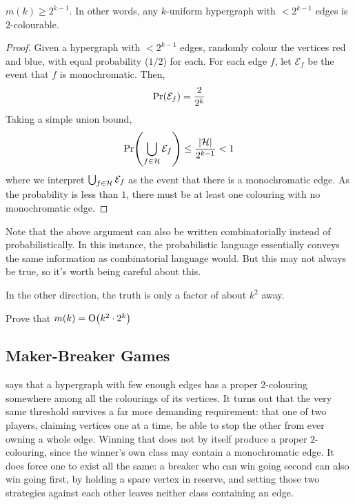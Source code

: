 \begin{boxtheorem}\label{Ch2:Thm:mk_Lower_Bound}
    $m(k) \geq 2^{k - 1}$. In other words, any $k$-uniform hypergraph with $< 2^{k - 1}$ edges is $2$-colourable.
\end{boxtheorem}
\begin{proof}
    Given a hypergraph with $< 2^{k-1}$ edges, randomly colour the vertices red and blue, with equal probability ($1/2$) for each. For each edge $f$, let $\mathcal{E}_f$ be the event that $f$ is monochromatic. Then,
    \begin{align*}
        \Pr\!\left( \mathcal{E}_f \right) = \frac{2}{2^k}
    \end{align*}
    Taking a simple union bound,
    \begin{align*}
        \Pr\!\left( \bigcup_{f \in \mathcal{H}} \mathcal{E}_f \right) \leq \frac{\left\lvert \mathcal{H} \right\rvert}{2^{k - 1}} < 1
    \end{align*}
    where we interpret $\bigcup_{f \in \mathcal{H}} \mathcal{E}_f$ as the event that there is a monochromatic edge. As the probability is less than $1$, there must be at least one colouring with no monochromatic edge.
\end{proof}

Note that the above argument can also be written combinatorially instead of probabilistically. In this instance, the probabilistic language essentially conveys the same information as combinatorial language would. But this may not always be true, so it's worth being careful about this.

In the other direction, the truth is only a factor of about $k^2$ away.

\begin{boxexercise}
    Prove that $m(k) = \operatorname{O}\!\left( k^2 \cdot 2^k \right)$
\end{boxexercise}

\subsection{Maker-Breaker Games}

 says that a hypergraph with few enough edges has a proper $2$-colouring somewhere among all the colourings of its vertices. It turns out that the very same threshold survives a far more demanding requirement: that one of two players, claiming vertices one at a time, be able to stop the other from ever owning a whole edge. Winning that does not by itself produce a proper $2$-colouring, since the winner's own class may contain a monochromatic edge. It does force one to exist all the same: a breaker who can win going second can also win going first, by holding a spare vertex in reserve, and setting those two strategies against each other leaves neither class containing an edge.

